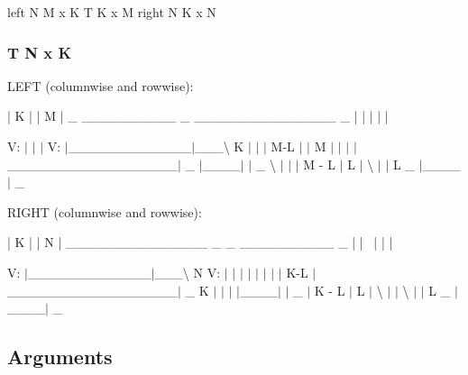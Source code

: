 left N M x K T K x M right N K x N \subsubsection*{T N x K }

L\+E\+F\+T (columnwise and rowwise)\+: \begin{DoxyVerb}        |    K    |                 |         M         |
     _  __________   _              _______________        _
        |    |    |                 |             | \
\end{DoxyVerb}
 V\+: $\vert$ $\vert$ $\vert$ V\textquotesingle{}\+: $\vert$\+\_\+\+\_\+\+\_\+\+\_\+\+\_\+\+\_\+\+\_\+\+\_\+\+\_\+\+\_\+\+\_\+\+\_\+\+\_\+$\vert$\+\_\+\+\_\+\+\_\+\textbackslash{} K $\vert$ $\vert$ $\vert$ M-\/\+L $\vert$ $\vert$ M $\vert$ $\vert$ $\vert$ $\vert$\+\_\+\+\_\+\+\_\+\+\_\+\+\_\+\+\_\+\+\_\+\+\_\+\+\_\+\+\_\+\+\_\+\+\_\+\+\_\+\+\_\+\+\_\+\+\_\+\+\_\+\+\_\+$\vert$ \+\_\+ $\vert$\+\_\+\+\_\+\+\_\+\+\_\+$\vert$ $\vert$ \+\_\+ \textbackslash{} $\vert$ $\vert$ $\vert$ M -\/ L $\vert$ L $\vert$ \textbackslash{} $\vert$ $\vert$ L \+\_\+ $|$\+\_\+\+\_\+\+\_\+\+\_\+$\vert$ \+\_\+

R\+I\+G\+H\+T (columnwise and rowwise)\+: \begin{DoxyVerb}    |         K         |                   |    N    |
    _______________        _             _  __________   _
    |             | \                       |    |    |
\end{DoxyVerb}
 V\textquotesingle{}\+: $\vert$\+\_\+\+\_\+\+\_\+\+\_\+\+\_\+\+\_\+\+\_\+\+\_\+\+\_\+\+\_\+\+\_\+\+\_\+\+\_\+$\vert$\+\_\+\+\_\+\+\_\+\textbackslash{} N V\+: $\vert$ $\vert$ $\vert$ $\vert$ $\vert$ $\vert$ $\vert$ $\vert$ K-\/\+L $\vert$\+\_\+\+\_\+\+\_\+\+\_\+\+\_\+\+\_\+\+\_\+\+\_\+\+\_\+\+\_\+\+\_\+\+\_\+\+\_\+\+\_\+\+\_\+\+\_\+\+\_\+\+\_\+$\vert$ \+\_\+ K $\vert$ $\vert$ $\vert$ $\vert$\+\_\+\+\_\+\+\_\+\+\_\+$\vert$ $\vert$ \+\_\+ $\vert$ K -\/ L $\vert$ L $\vert$ \textbackslash{} $\vert$ $\vert$ \textbackslash{} $\vert$ $\vert$ L \+\_\+ $|$\+\_\+\+\_\+\+\_\+\+\_\+$\vert$ \+\_\+

\subsection*{Arguments }


